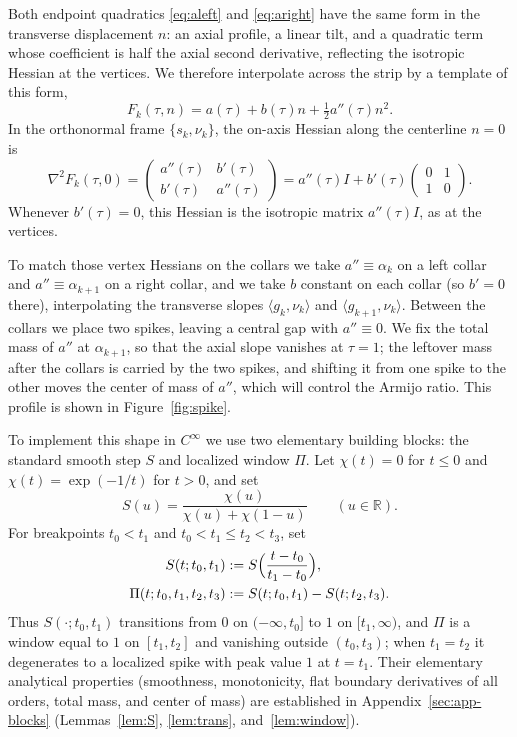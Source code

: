 \documentclass[11pt]{article}
\newcommand{\R}{\mathbb{R}}
\newcommand{\ip}[2]{\langle #1,#2\rangle}
\begin{document}
Both endpoint quadratics \eqref{eq:aleft} and \eqref{eq:aright} have the same form in the transverse displacement $n$: an axial profile, a linear tilt, and a quadratic term whose coefficient is half the axial second derivative, reflecting the isotropic Hessian at the vertices. We therefore interpolate across the strip by a template of this form,
\begin{equation}
\label{eq:template}
F_k(\tau, n) = a(\tau) + b(\tau)n + \tfrac12 a''(\tau)n^2.
\end{equation}
In the orthonormal frame $\{s_k, \nu_k\}$, the on-axis Hessian along the centerline $n=0$ is
\begin{equation}
\label{eq:Hess0}
\nabla^2 F_k(\tau, 0) = \begin{pmatrix} a''(\tau) & b'(\tau) \\ b'(\tau) & a''(\tau) \end{pmatrix} = a''(\tau) I + b'(\tau)\begin{pmatrix} 0 & 1 \\ 1 & 0 \end{pmatrix}.
\end{equation}
Whenever $b'(\tau) = 0$, this Hessian is the isotropic matrix $a''(\tau) I$, as at the vertices.

To match those vertex Hessians on the collars we take $a''\equiv\alpha_k$ on a left collar and $a''\equiv\alpha_{k+1}$ on a right collar, and we take $b$ constant on each collar (so $b'=0$ there), interpolating the transverse slopes $\ip{g_k}{\nu_k}$ and $\ip{g_{k+1}}{\nu_k}$. Between the collars we place two spikes, leaving a central gap with $a''\equiv0$. We fix the total mass of $a''$ at $\alpha_{k+1}$, so that the axial slope vanishes at $\tau=1$; the leftover mass after the collars is carried by the two spikes, and shifting it from one spike to the other moves the center of mass of $a''$, which will control the Armijo ratio. This profile is shown in Figure~\ref{fig:spike}.

To implement this shape in $C^\infty$ we use two elementary building blocks: the standard smooth step $S$ and localized window $\Pi$.
Let $\chi(t) = 0$ for $t \le 0$ and $\chi(t) = \exp(-1/t)$ for $t > 0$, and set
\begin{equation}
\label{eq:Sdef}
S(u) = \frac{\chi(u)}{\chi(u) + \chi(1-u)} \qquad (u \in \R).
\end{equation}
For breakpoints $t_0 < t_1$ and $t_0 < t_1 \le t_2 < t_3$, set
\begin{align}
\label{eq:Sparam}
S(t; t_0, t_1) &:= S\Bigl(\frac{t-t_0}{t_1-t_0}\Bigr), \\
\label{eq:Pidef}
\Pi(t; t_0, t_1, t_2, t_3) &:= S(t; t_0, t_1) - S(t; t_2, t_3).
\end{align}
Thus $S(\cdot; t_0, t_1)$ transitions from $0$ on $(-\infty, t_0]$ to $1$ on $[t_1, \infty)$, and $\Pi$ is a window equal to $1$ on $[t_1, t_2]$ and vanishing outside $(t_0, t_3)$; when $t_1 = t_2$ it degenerates to a localized spike with peak value $1$ at $t = t_1$.
Their elementary analytical properties (smoothness, monotonicity, flat boundary derivatives of all orders, total mass, and center of mass) are established in Appendix~\ref{sec:app-blocks} (Lemmas~\ref{lem:S}, \ref{lem:trans}, and~\ref{lem:window}).
\end{document}
